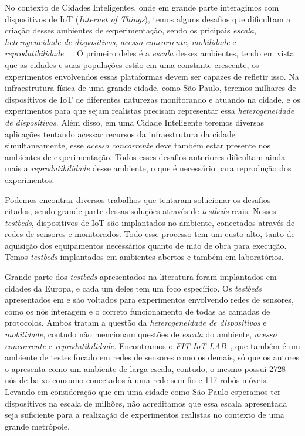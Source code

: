 No contexto de Cidades Inteligentes, onde em grande parte interagimos com dispositivos de IoT (\textit{Internet of Things}), temos alguns desafios que dificultam a criação desses ambientes de
experimentação, sendo os pricipais \textit{escala}, \textit{heterogeneidade de dispositivos}, \textit{acesso concorrente}, \textit{mobilidade} e 
\textit{reprodutibilidade}~\cite{gluhak_2011}~\cite{sanchez_2014}.
O primeiro deles é a \textit{escala} desses ambientes, tendo em vista que as cidades e suas populações estão em uma constante crescente, os experimentos envolvendos essas plataformas devem ser capazes
de refletir isso.
Na infraestrutura física de uma grande cidade, como São Paulo, teremos milhares de dispositivos de IoT de diferentes naturezas monitorando e atuando na cidade, e os experimentos para que sejam realistas
precisam representar essa \textit{heterogeneidade de dispositivos}.
Além disso, em uma Cidade Inteligente teremos diversas aplicações tentando acessar recursos da infraestrutura da cidade simultaneamente, esse \textit{acesso concorrente} deve também estar presente nos
ambientes de experimentação.
Todos esses desafios anteriores dificultam ainda mais a \textit{reprodutibilidade} desse ambiente, o que é necessário para reprodução dos experimentos. 

Podemos encontrar diversos trabalhos que tentaram solucionar os desafios citados, sendo grande parte dessas soluções através de \textit{testbeds} reais.
Nesses \textit{testbeds}, dispositivos de IoT são implantados no ambiente, conectados através de redes de sensores e monitorados.
Todo esse processo tem um custo alto, tanto de aquisição dos equipamentos necessários quanto de mão de obra para execução.
Temos \textit{testbeds} implantados em ambientes abertos e também em laboratórios.

Grande parte dos \textit{testbeds} apresentados na literatura foram implantados em cidades da Europa, e cada um deles tem um foco específico.
Os \textit{testbeds} apresentados em  \cite{olivares_2013} e \cite{cenedese_2014} são voltados para experimentos envolvendo redes de sensores, como os nós interagem e o correto
funcionamento de todas as camadas de protocolos.
Ambos tratam a questão da \textit{heterogeneidade de dispositivos} e \textit{mobilidade}, contudo não mencionam questões de \textit{escala} do ambiente,
\textit{acesso concorrente} e \textit{reprodutibilidade}.
Encontramos o \textit{FIT IoT-LAB}~\cite{adjih_2015}, que também é um ambiente de testes focado em redes de sensores como os demais, só que os autores o apresenta como um ambiente de larga escala,
contudo, o mesmo possui 2728 nós de baixo consumo conectados à uma rede sem fio e 117 robôs móveis.
Levando em consideração que em uma cidade como São Paulo esperamos ter dispositivos na escala de milhões, não acreditamos que essa escala apresentada seja suficiente para a realização de experimentos
realistas no contexto de uma grande metrópole.

